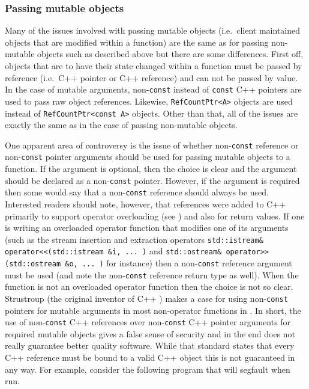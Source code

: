 %
\subsubsection{Passing mutable objects}
%

Many of the issues involved with passing mutable objects (i.e.~client
maintained objects that are modified within a function) are the same as
for passing non-mutable objects such as described above but there are
some differences.  First off, objects that are to have their state
changed within a function must be passed by reference (i.e.~C++
pointer or C++ reference) and can not be passed by value.  In the case
of mutable arguments, non-{}\texttt{const} instead of {}\texttt{const}
C++ pointers are used to pass raw object references.  Likewise,
{}\texttt{Ref\-Count\-Ptr<A>} objects are used instead of
{}\texttt{Ref\-Count\-Ptr<const A>} objects.  Other than that, all of
the issues are exactly the same as in the case of passing non-mutable
objects.

One apparent area of controversy is the issue of whether
non-\texttt{const} reference or non-\texttt{const} pointer arguments
should be used for passing mutable objects to a function.  If the
argument is optional, then the choice is clear and the argument should
be declared as a non-\texttt{const} pointer.  However, if the argument
is required then some would say that a non-\texttt{const} reference
should always be used.  Interested readers should note, however, that
references were added to C++ primarily to support operator overloading
(see {}\cite[Section 3.7]{ref:design_evol_cpp}) and also for return
values.  If one is writing an overloaded operator function that
modifies one of its arguments (such as the stream insertion and
extraction operators {}\texttt{std::istream\& operator<<(std::istream
\&i, ... )} and {}\texttt{std::ostream\& operator>>(std::ostream \&o,
... )} for instance) then a non-\texttt{const} reference argument must
be used (and note the non-\texttt{const} reference return type as
well).  When the function is not an overloaded operator function then
the choice is not so clear.  Strustroup (the original inventor of C++
{}\cite{ref:design_evol_cpp}) makes a case for using
non-\texttt{const} pointers for mutable arguments in most non-operator
functions in {}\cite[Section 5.5]{ref:stroustrup_2000}.  In short, the
use of non-{}\texttt{const} C++ references over non-{}\texttt{const}
C++ pointer arguments for required mutable objects gives a false sense
of security and in the end does not really guarantee better quality
software.  While that standard states that every C++ reference must be
bound to a valid C++ object this is not guaranteed in any way.  For example,
consider the following program that will segfault when run.

